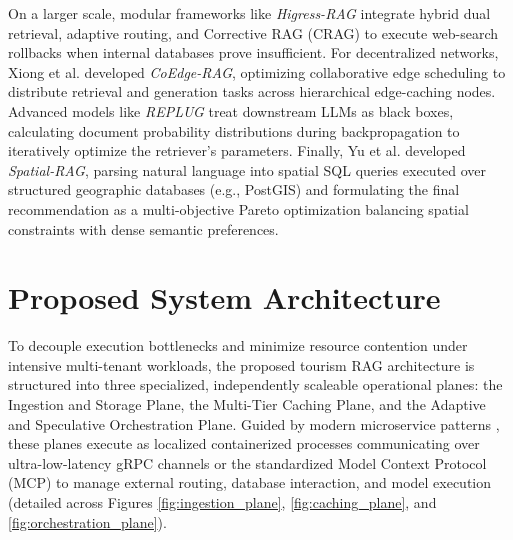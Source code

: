 \documentclass{ieeeaccess}
\begin{document}
On a larger scale, modular frameworks like \emph{Higress-RAG} \cite{lin-higress-2025} integrate hybrid dual retrieval, adaptive routing, and Corrective RAG (CRAG) to execute web-search rollbacks when internal databases prove insufficient. For decentralized networks, Xiong et al. \cite{xiong-coedge-rag-2025} developed \emph{CoEdge-RAG}, optimizing collaborative edge scheduling to distribute retrieval and generation tasks across hierarchical edge-caching nodes. Advanced models like \emph{REPLUG} \cite{shi-replug-2024} treat downstream LLMs as black boxes, calculating document probability distributions during backpropagation to iteratively optimize the retriever’s parameters. Finally, Yu et al. \cite{yu-spatial-rag-2025} developed \emph{Spatial-RAG}, parsing natural language into spatial SQL queries executed over structured geographic databases (e.g., PostGIS) and formulating the final recommendation as a multi-objective Pareto optimization balancing spatial constraints with dense semantic preferences.

\section{Proposed System Architecture}
To decouple execution bottlenecks and minimize resource contention under intensive multi-tenant workloads, the proposed tourism RAG architecture is structured into three specialized, independently scaleable operational planes: the Ingestion and Storage Plane, the Multi-Tier Caching Plane, and the Adaptive and Speculative Orchestration Plane. Guided by modern microservice patterns \cite{devalla-microservice-rag-2025}, these planes execute as localized containerized processes communicating over ultra-low-latency gRPC channels or the standardized Model Context Protocol (MCP) to manage external routing, database interaction, and model execution (detailed across Figures \ref{fig:ingestion_plane}, \ref{fig:caching_plane}, and \ref{fig:orchestration_plane}).
\end{document}
